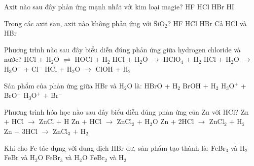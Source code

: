 \documentclass[Main.tex]{subfiles}
\begin{document}
    \begin{ex}
    Axit nào sau đây phản ứng mạnh nhất với kim loại magie?
    \choice
    {HF}
    {HCl}
    {HBr}
    {\True HI}
    \end{ex}
    
    \begin{ex}
    Trong các axit sau, axit nào không phản ứng với SiO$_2$?
    \choice
    {HF}
    {HCl}
    {HBr}
    {\True Cả HCl và HBr}
    \end{ex}
    
    \begin{ex}
    Phương trình nào sau đây biểu diễn đúng phản ứng giữa hydrogen chloride và nước?
    \choice
    {HCl + H$_2$O $\rightleftharpoons$ HOCl + H$_2$}
    {HCl + H$_2$O $\rightarrow$ HClO$_4$ + H$_2$}
    {\True HCl + H$_2$O $\rightarrow$ H$_3$O$^+$ + Cl$^-$}
    {HCl + H$_2$O $\rightarrow$ ClOH + H$_2$}
    \end{ex}
    
    \begin{ex}
    Sản phẩm của phản ứng giữa HBr và H$_2$O là:
    \choice
    {HBrO + H$_2$}
    {BrOH + H$_2$}
    {H$_3$O$^+$ + BrO$^-$}
    {\True H$_3$O$^+$ + Br$^-$}
    \end{ex}
    
    \begin{ex}
    Phương trình hóa học nào sau đây biểu diễn đúng phản ứng của Zn với HCl?
    \choice
    {Zn + HCl $\rightarrow$ ZnCl + H}
    {Zn + HCl $\rightarrow$ ZnCl$_2$ + H$_2$O}
    {\True Zn + 2HCl $\rightarrow$ ZnCl$_2$ + H$_2$}
    {Zn + 3HCl $\rightarrow$ ZnCl$_3$ + H$_2$}
    \end{ex}
    
    \begin{ex}
    Khi cho Fe tác dụng với dung dịch HBr dư, sản phẩm tạo thành là:
    \choice
    {FeBr$_3$ và H$_2$}
    {FeBr và H$_2$O}
    {FeBr$_3$ và H$_2$O}
    {\True FeBr$_2$ và H$_2$}
    \end{ex}
    
\end{document}
